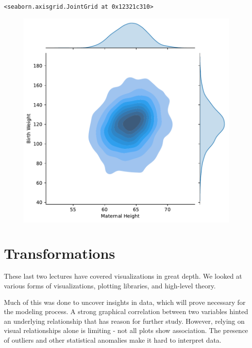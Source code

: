 \documentclass[
  letterpaper,
  DIV=11,
  numbers=noendperiod]{scrreprt}
\begin{document}
\begin{verbatim}
<seaborn.axisgrid.JointGrid at 0x12321c310>
\end{verbatim}

\begin{figure}[H]

{\centering \includegraphics{visualization_2/visualization_2_files/figure-pdf/cell-12-output-2.pdf}

}

\end{figure}

\hypertarget{transformations}{%
\section{Transformations}\label{transformations}}

These last two lectures have covered visualizations in great depth. We
looked at various forms of visualizations, plotting libraries, and
high-level theory.

Much of this was done to uncover insights in data, which will prove
necessary for the modeling process. A strong graphical correlation
between two variables hinted an underlying relationship that has reason
for further study. However, relying on visual relationships alone is
limiting - not all plots show association. The presence of outliers and
other statistical anomalies make it hard to interpret data.
\end{document}
